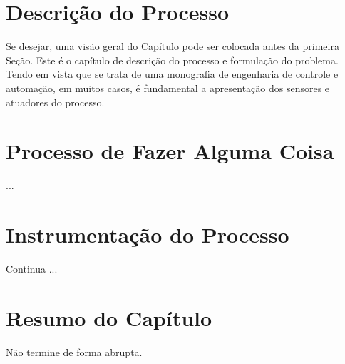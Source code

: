 \section*{Descrição do Processo}

Se desejar, uma visão geral do Capítulo pode ser colocada antes da primeira Seção. Este é o capítulo de descrição do processo e formulação do problema. Tendo em vista que se trata de uma monografia de engenharia de controle e automação, em muitos casos, é fundamental a apresentação dos sensores e atuadores do processo.


\section{Processo de Fazer Alguma Coisa}
\label{hist}

...


\section{Instrumentação do Processo}
\label{telefone}



Continua ...


\section{Resumo do Capítulo}

Não termine de forma abrupta.



\clearpage